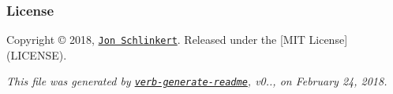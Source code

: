 \subsubsection*{License}

Copyright © 2018, \href{https://github.com/jonschlinkert}{\tt Jon Schlinkert}. Released under the \mbox{[}M\+IT License\mbox{]}(L\+I\+C\+E\+N\+SE).





{\itshape This file was generated by \href{https://github.com/verbose/verb-generate-readme}{\tt verb-\/generate-\/readme}, v0.., on February 24, 2018.} 